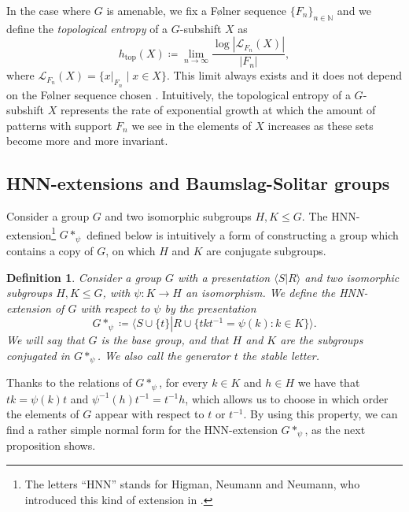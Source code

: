 \documentclass[cupthm,crop,info]{CUP-JNL-ETS}%
\theoremstyle{cupplain}
\theoremstyle{cupdefinition}
\newtheorem{definition}{Definition}[section]
\theoremstyle{cupremark}
\theoremstyle{cupproof}
\numberwithin{equation}{section}
\def\htop{h_{\mathrm{top}}}
\begin{document}
In the case where $G$ is amenable, we fix a F\o lner sequence $\{F_n\}_{n\in \mathbb{N}}$ and we define the \textit{topological entropy} of a $G$-subshift $X$ as
$$
\htop(X)\coloneqq \lim_{n\to \infty}\frac{\log|\mathcal{L}_{F_n}(X)|}{|F_n|},
$$
where  $\mathcal{L}_{F_n}(X)=\{x|_{F_n}\mid x\in X\}$. This limit always exists and it does not depend on the F\o lner sequence chosen \cite[Theorem~4.38]{Kerr2016}. Intuitively, the topological entropy of a $G$-subshift $X$ represents the rate of exponential growth at which the amount of patterns with support $F_n$ we see in the elements of $X$ increases as these sets become more and more invariant.


\subsection{HNN-extensions and Baumslag-Solitar groups}
Consider a group $G$ and two isomorphic subgroups $H,K\le G$. The HNN-extension\footnote{The letters ``HNN'' stands for Higman, Neumann and Neumann, who introduced this kind of extension in \cite{HNN49}.} $G*_{\psi}$ defined below is intuitively a form of constructing a group which contains a copy of $G$, on which $H$ and $K$ are conjugate subgroups.

\begin{definition}\label{definition.hnn_extension} Consider a group $G$ with a presentation $\langle S\left|\right. R\rangle$ and two isomorphic subgroups $H,K\le G$, with $\psi:K\to H$ an isomorphism. We define the \textit{HNN-extension} of $G$ with respect to $\psi$ by the presentation
	$$
	G*_{\psi}\coloneqq \langle S\cup\{t\} \left|\right. R\cup \{t k t^{-1}=\psi(k): k\in K \} \rangle.
	$$
	We will say that $G$ is the \textit{base group}, and that $H$ and $K$ are the subgroups conjugated in $G*_{\psi}$. We also call the generator $t$ the \textit{stable letter}.
\end{definition}
Thanks to the relations of $G*_{\psi}$, for every $k\in K$ and $h\in H$ we have that $tk=\psi(k)t$ and $\psi^{-1}(h)t^{-1}=t^{-1}h$, which allows us to choose in which order the elements of $G$ appear with respect to $t$ or $t^{-1}$. By using this property, we can find a rather simple normal form for the HNN-extension $G*_{\psi}$, as the next proposition shows.
\end{document}

